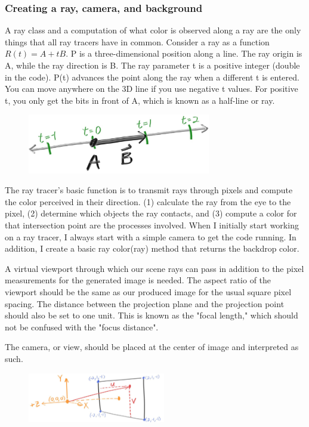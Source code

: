\documentclass[conference]{IEEEtran}
\begin{document}
\subsubsection{Creating a ray, camera, and background}
A ray class and a computation of what color is observed along a ray are the only things that all ray tracers have in common. Consider a ray as a function \(R(t)=A+tB\). P is a three-dimensional position along a line. The ray origin is A, while the ray direction is B. The ray parameter t is a positive integer (double in the code). P(t) advances the point along the ray when a different t is entered. You can move anywhere on the 3D line if you use negative t values. For positive t, you only get the bits in front of A, which is known as a half-line or ray\cite{b6}.

\begin{figure}[h]
\includegraphics[width=8cm]{images/ch4-1.jpg}
\centering
\end{figure}

The ray tracer's basic function is to transmit rays through pixels and compute the color perceived in their direction. (1) calculate the ray from the eye to the pixel, (2) determine which objects the ray contacts, and (3) compute a color for that intersection point are the processes involved. When I initially start working on a ray tracer, I always start with a simple camera to get the code running. In addition, I create a basic ray color(ray) method that returns the backdrop color\cite{b6}.

A virtual viewport through which our scene rays can pass in addition to the pixel measurements for the generated image is needed. The aspect ratio of the viewport should be the same as our produced image for the usual square pixel spacing. The distance between the projection plane and the projection point should also be set to one unit. This is known as the "focal length," which should not be confused with the "focus distance".

The camera, or view, should be placed at the center of image and interpreted as such.

\begin{figure}[h]
\includegraphics[width=6cm]{images/ch4-2.jpg}
\centering
\end{figure}
\end{document}
